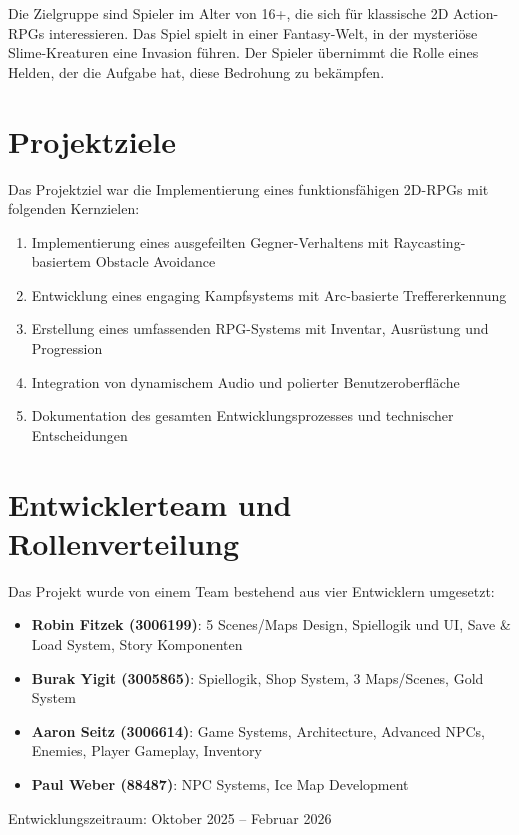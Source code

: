 \documentclass[
  a4paper,
  11pt,
  ngerman,
  parskip=half,
  bibliography=totoc,
  listof=totoc
]{scrreprt}
\begin{document}
Die Zielgruppe sind Spieler im Alter von 16+, die sich für klassische 2D Action-RPGs interessieren. Das Spiel spielt in einer Fantasy-Welt, in der mysteriöse Slime-Kreaturen eine Invasion führen. Der Spieler übernimmt die Rolle eines Helden, der die Aufgabe hat, diese Bedrohung zu bekämpfen.

\section{Projektziele}

Das Projektziel war die Implementierung eines funktionsfähigen 2D-RPGs mit folgenden Kernzielen:

\begin{enumerate}
    \item Implementierung eines ausgefeilten Gegner-Verhaltens mit Raycasting-basiertem Obstacle Avoidance
    \item Entwicklung eines engaging Kampfsystems mit Arc-basierte Treffererkennung
    \item Erstellung eines umfassenden RPG-Systems mit Inventar, Ausrüstung und Progression
    \item Integration von dynamischem Audio und polierter Benutzeroberfläche
    \item Dokumentation des gesamten Entwicklungsprozesses und technischer Entscheidungen
\end{enumerate}

\section{Entwicklerteam und Rollenverteilung}

Das Projekt wurde von einem Team bestehend aus vier Entwicklern umgesetzt:

\begin{itemize}
    \item \textbf{Robin Fitzek (3006199)}: 5 Scenes/Maps Design, Spiellogik und UI, Save \& Load System, Story Komponenten
    \item \textbf{Burak Yigit (3005865)}: Spiellogik, Shop System, 3 Maps/Scenes, Gold System
    \item \textbf{Aaron Seitz (3006614)}: Game Systems, Architecture, Advanced NPCs, Enemies, Player Gameplay, Inventory
    \item \textbf{Paul Weber (88487)}: NPC Systems, Ice Map Development
\end{itemize}

Entwicklungszeitraum: Oktober 2025 -- Februar 2026
\end{document}
